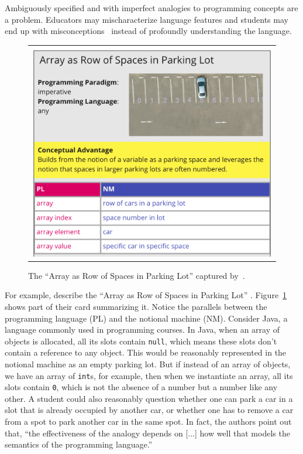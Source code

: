{Ambiguously specified \nms{}
and
\nms{} with imperfect analogies to programming concepts
are a problem.
Educators may mischaracterize language features and
students may end up with misconceptions~\citep{chiodiniCuratedInventoryProgramming2021} instead of profoundly understanding the language.

\begin{figure}
    \centering
    \begin{tabular}{c}
        \includegraphics[width=.50\textwidth]{images/nm-definition-cards/nm-array-as-row-of-spaces-in-parking-lot-cut}
    \end{tabular}
     \caption{The ``Array as Row of Spaces in Parking Lot'' \nm{} captured by~\citet{fincherNotionalMachinesComputing2020}.}
    \label{fig:parkingSpaces}
\end{figure}

For example,
\citet{fincherNotionalMachinesComputing2020} describe the
``Array as Row of Spaces in Parking Lot'' \nm{}.
Figure~\ref{fig:parkingSpaces} shows part of their card summarizing it.
Notice the parallels between the programming language (PL) and the notional machine (NM).
Consider Java, a language commonly used in programming courses.
In Java,
when an array of objects is allocated,
all its slots contain
\texttt{null},
which means these slots don't contain a reference to any object.
This would be reasonably represented in the notional machine as an empty parking lot.
But if instead of an array of objects, we have an array of
\texttt{int}s,
for example,
then when we instantiate an array,
all its slots contain
\texttt{0},
which is not the absence of a number but a number like any other.
%
A student could also reasonably question whether
one can park a car in a slot that is already occupied by another car,
or whether
one has to remove a car from a spot to park another car in the same spot.
%
In fact, the authors point out that,
``the effectiveness of the analogy depends on
[...]
how well that models the semantics of the programming language.''


}

